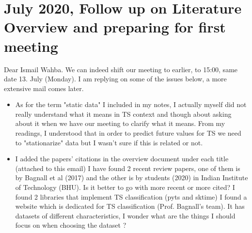 \documentclass{article}
\newcommand{\cmark}{\ding{51}}%
\newcommand{\done}{\rlap{$\square$}{\raisebox{2pt}{\large\hspace{1pt}\cmark}}%
\hspace{-2.5pt}}
\begin{document}
\section*{\texorpdfstring{}. July 2020, Follow up on Literature Overview and preparing for first meeting}
Dear Ismail Wahba.\newline
We can indeed shift our meeting to earlier, to 15:00, same date 13. July (Monday). I am replying on some of the issues below, a more extensive mail comes later.
 \begin{itemize}
	\item As for the term "static data" I included in my notes, I actually myself did not really understand what it means in TS context and though about asking about it when we have our meeting to clarify what it means. From my readings, I understood that in order to predict future values for TS we need to "stationarize" data but I wasn't sure if this is related or not.
	\item I added the papers' citations in the overview document under each title (attached to this email)\newline
		  I have found 2 recent review papers, one of them is by Bagnall et al (2017) and the other is by students (2020) in Indian Institute of Technology (BHU). Is it better to go with more recent or more cited?\newline
		  I found 2 libraries that implement TS classification (pyts and sktime)\newline
		  I found a website which is dedicated for TS classification (Prof. Bagnall's team). It has datasets of different characteristics, I wonder what are the things I should focus on when choosing the dataset ?
 \end{itemize}
\end{document}
